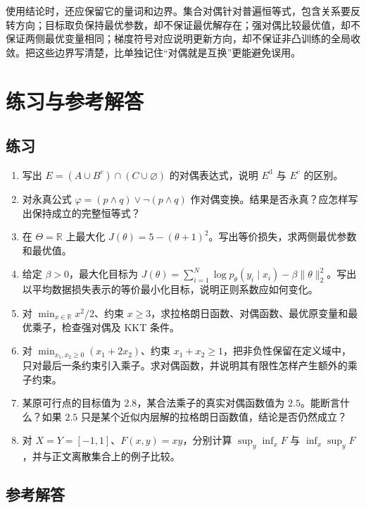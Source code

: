 \documentclass[UTF8]{ctexart}
\begin{document}
使用结论时，还应保留它的量词和边界。集合对偶针对普遍恒等式，包含关系要反转方向；目标取负保持最优参数，却不保证最优解存在；强对偶比较最优值，却不保证两侧最优变量相同；梯度符号对应说明更新方向，却不保证非凸训练的全局收敛。把这些边界写清楚，比单独记住“对偶就是互换”更能避免误用。

\section{练习与参考解答}
\label{sec:duality-exercises}

\subsection{练习}

\begin{enumerate}
 \item\label{exercise:duality-expression} 写出 $E=(A\cup B^c)\cap(C\cup\varnothing)$ 的对偶表达式，说明 $E^{\mathrm d}$ 与 $E^c$ 的区别。
 \item\label{exercise:duality-logic} 对永真公式 $\varphi=(p\land q)\lor\neg(p\land q)$ 作对偶变换。结果是否永真？应怎样写出保持成立的完整恒等式？
 \item\label{exercise:duality-score} 在 $\Theta=\mathbb R$ 上最大化 $J(\theta)=5-(\theta+1)^2$。写出等价损失，求两侧最优参数和最优值。
 \item\label{exercise:duality-regularizer} 给定 $\beta>0$，最大化目标为 $J(\theta)=\sum_{i=1}^N\log p_\theta(y_i\mid x_i)-\beta\|\theta\|_2^2$。写出以平均数据损失表示的等价最小化目标，说明正则系数应如何变化。
 \item\label{exercise:duality-quadratic} 对 $\min_{x\in\mathbb R}x^2/2$、约束 $x\geq3$，求拉格朗日函数、对偶函数、最优原变量和最优乘子，检查强对偶及 KKT 条件。
 \item\label{exercise:duality-domain} 对 $\min_{x_1,x_2\geq0}(x_1+2x_2)$、约束 $x_1+x_2\geq1$，把非负性保留在定义域中，只对最后一条约束引入乘子。求对偶函数，并说明其有限性怎样产生额外的乘子约束。
 \item\label{exercise:duality-upper} 某原可行点的目标值为 $2.8$，某合法乘子的真实对偶函数值为 $2.5$。能断言什么？如果 $2.5$ 只是某个近似内层解的拉格朗日函数值，结论是否仍然成立？
 \item\label{exercise:duality-minimax} 对 $X=Y=[-1,1]$、$F(x,y)=xy$，分别计算 $\sup_y\inf_xF$ 与 $\inf_x\sup_yF$，并与正文离散集合上的例子比较。
\end{enumerate}

\subsection{参考解答}
\end{document}
